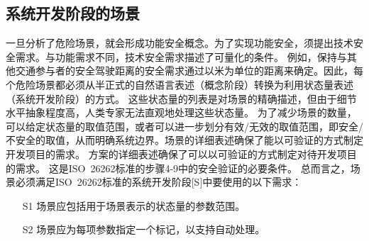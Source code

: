 \subsection{系统开发阶段的场景}
一旦分析了危险场景，就会形成功能安全概念。为了实现功能安全，须提出技术安全需求。与功能需求不同，技术安全需求描述了可量化的条件。
例如，保持与其他交通参与者的安全驾驶距离的安全需求通过以米为单位的距离来确定。因此，每个危险场景都必须从半正式的自然语言表述（概念阶段）转换为利用状态量表述（系统开发阶段）的方式。
这些状态量的列表是对场景的精确描述，但由于细节水平抽象程度高，人类专家无法直观地处理这些状态量。
为了减少场景的数量，可以给定状态量的取值范围，或者可以进一步划分有效/无效的取值范围，即安全/不安全的取值，从而明确系统边界。场景的详细表述确保了能以可验证的方式制定开发项目的需求。
方案的详细表述确保了可以以可验证的方式制定对待开发项目的需求。
这是ISO~26262标准的步骤4-9中的安全验证的必要条件。
总而言之，场景必须满足ISO~26262标准的系统开发阶段[S]中要使用的以下需求：
\begin{itemize}
	\item[S1] 场景应包括用于场景表示的状态量的参数范围。
	\item[S2] 场景应为每项参数指定一个标记，以支持自动处理。
\end{itemize}

